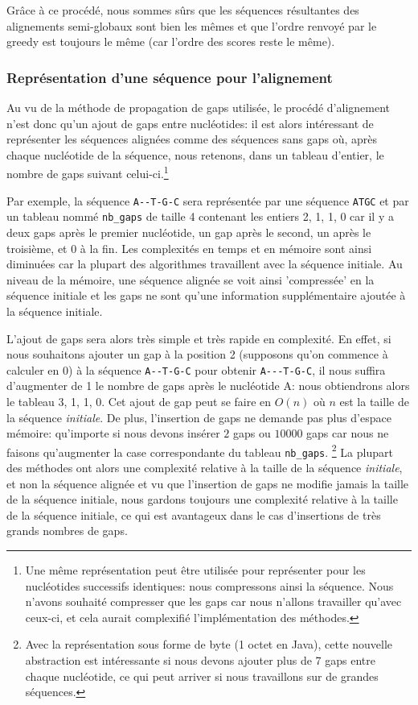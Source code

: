 Grâce à ce procédé, nous sommes sûrs que les séquences résultantes des
alignements semi-globaux sont bien les mêmes et que l'ordre renvoyé par le greedy
est toujours le même (car l'ordre des scores reste le même).

\subsubsection{Représentation d'une séquence pour l'alignement}
\label{subsubsection:repr_sequence_alignment}

Au vu de la méthode de propagation de gaps utilisée, le procédé d'alignement n'est
donc qu'un ajout de gaps entre nucléotides: il est alors intéressant de
représenter les séquences alignées comme des séquences sans gaps où, après
chaque nucléotide de la séquence, nous retenons, dans un tableau d'entier, le
nombre de gaps suivant celui-ci.\footnote{Une même représentation peut être
	utilisée pour représenter pour les nucléotides successifs identiques: nous
	compressons ainsi la séquence. Nous n'avons souhaité compresser que les gaps
	car nous n'allons travailler qu'avec ceux-ci, et cela aurait complexifié
l'implémentation des méthodes.}

Par exemple, la séquence \verb|A--T-G-C| sera représentée par une séquence
\verb|ATGC| et par un tableau nommé \verb|nb_gaps| de taille 4
contenant les entiers {2, 1, 1, 0} car il y a deux gaps après le premier
nucléotide, un gap après le second, un après le troisième, et 0 à la fin. Les
complexités en temps et en mémoire sont ainsi diminuées car la plupart des
algorithmes travaillent avec la séquence initiale.
Au niveau de la mémoire, une séquence alignée se voit ainsi 'compressée' en la
séquence initiale et les gaps ne sont qu'une information supplémentaire ajoutée
à la séquence initiale.

L'ajout de gaps sera alors très simple et très rapide en complexité. En effet,
si nous souhaitons ajouter un gap à la position 2 (supposons qu'on commence à
calculer en 0) à la séquence \verb|A--T-G-C| pour obtenir \verb|A---T-G-C|, il
nous suffira d'augmenter de 1 le nombre de gaps après le nucléotide A: nous
obtiendrons alors le tableau {3, 1, 1, 0}. Cet ajout de gap peut se faire en
$O(n)$ où $n$ est la taille de la séquence \textit{initiale}. De plus,
l'insertion de gaps ne demande pas plus d'espace mémoire: qu'importe si nous
devons insérer $2$ gaps ou $10000$ gaps car nous ne faisons qu'augmenter la case
correspondante du tableau \verb|nb_gaps|. \footnote{Avec la représentation sous
	forme de byte (1 octet en Java), cette nouvelle abstraction est intéressante
si nous devons ajouter plus de 7 gaps entre chaque nucléotide, ce qui peut arriver si nous travaillons sur de grandes séquences.} La
plupart des méthodes ont alors une complexité relative à la taille de la
séquence \textit{initiale}, et non la séquence alignée et vu que l'insertion de
gaps ne modifie jamais la taille de la séquence initiale, nous
gardons toujours une complexité relative à la taille de la séquence initiale, ce
qui est avantageux dans le cas d'insertions de très grands nombres de gaps.

